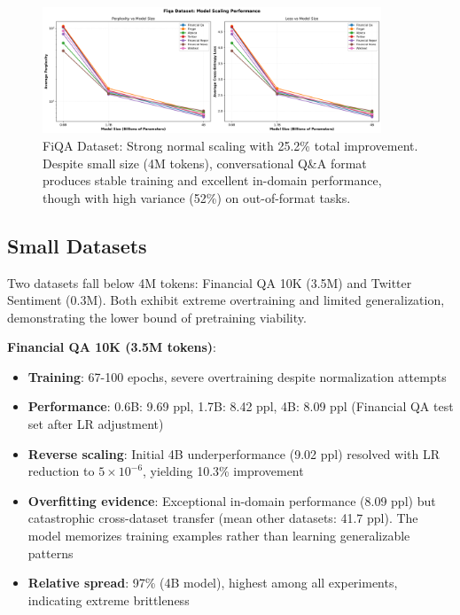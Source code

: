 \begin{figure}[h]
\centering
\includegraphics[width=0.9\textwidth]{figures/scaling_fiqa.png}
\caption[FiQA Dataset: Scaling Behavior]{FiQA Dataset: Strong normal scaling with 25.2\% total improvement. Despite small size (4M tokens), conversational Q\&A format produces stable training and excellent in-domain performance, though with high variance (52\%) on out-of-format tasks.}
\label{fig:scaling_fiqa}
\end{figure}







\subsection{Small Datasets}

Two datasets fall below 4M tokens: Financial QA 10K (3.5M) and Twitter Sentiment (0.3M). Both exhibit extreme overtraining and limited generalization, demonstrating the lower bound of pretraining viability.

\textbf{Financial QA 10K (3.5M tokens)}:
\begin{itemize}
\item \textbf{Training}: 67-100 epochs, severe overtraining despite normalization attempts
\item \textbf{Performance}: 0.6B: 9.69 ppl, 1.7B: 8.42 ppl, 4B: 8.09 ppl (Financial QA test set after LR adjustment)
\item \textbf{Reverse scaling}: Initial 4B underperformance (9.02 ppl) resolved with LR reduction to $5 \times 10^{-6}$, yielding 10.3\% improvement
\item \textbf{Overfitting evidence}: Exceptional in-domain performance (8.09 ppl) but catastrophic cross-dataset transfer (mean other datasets: 41.7 ppl). The model memorizes training examples rather than learning generalizable patterns
\item \textbf{Relative spread}: 97\% (4B model), highest among all experiments, indicating extreme brittleness
\end{itemize}

